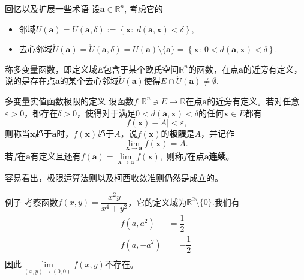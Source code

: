 
\begin{frame}

\begin{block}{回忆以及扩展一些术语}
设$\mathbf{a}\in\mathbb{R}^n$, 考虑它的
\begin{itemize}
\item 邻域$U(\mathbf{a}) = U(\mathbf{a},\delta) := \left\{ \mathbf{x}: \ d(\mathbf{a}, \mathbf{x}) < \delta \right\},$
\item 去心邻域$\mathring{U}(\mathbf{a}) = \mathring{U}(\mathbf{a},\delta) = U(\mathbf{a})\setminus \{\mathbf{a}\} = \left\{ \mathbf{x}: \ 0 < d(\mathbf{a}, \mathbf{x}) < \delta \right\}.$
\end{itemize}

\vspace{2em}
\pause

称多变量函数，即定义域$E$包含于某个欧氏空间$\mathbb{R}^n$的函数，在点$\mathbf{a}$的近旁有定义，说的是存在点$\mathbf{a}$的某个去心邻域$\mathring{U}(\mathbf{a})$使得$E\cap \mathring{U}(\mathbf{a}) \neq \emptyset.$
\end{block}

\end{frame}


\begin{frame}

\begin{block}{多变量实值函数极限的定义}
设函数$f: \mathbb{R}^n \ni E \to \mathbb{R}$在点$\mathbf{a}$的近旁有定义。若对任意$\varepsilon > 0$，都存在$\delta > 0$，使得对于满足$0 < d(\mathbf{a}, \mathbf{x}) < \delta$的任何$\mathbf{x}\in E$都有
\[|f(\mathbf{x})-A| < \varepsilon,\]
则称当$\mathbf{x}$趋于$\mathbf{a}$时，$f(\mathbf{x})$趋于$A$，说$f(\mathbf{x})$的{\bfseries 极限}是$A$，并记作
\[\lim\limits_{\mathbf{x}\to \mathbf{a}}f(\mathbf{x}) = A.\]
若$f$在$\mathbf{a}$有定义且还有$f(\mathbf{a}) = \lim\limits_{\mathbf{x}\to \mathbf{a}}f(\mathbf{x}),$ 则称$f$在点$\mathbf{a}${\bfseries 连续}。
\end{block}

\pause

容易看出，极限运算法则以及柯西收敛准则仍然是成立的。

\end{frame}


\begin{frame}

\begin{block}{例子}
考察函数\(\displaystyle f(x,y) = \dfrac{x^2y}{x^4+y^2}\)，它的定义域为$\mathbb{R}^2\setminus\{0\}.$我们有
\begin{align*}
f(a,a^2) & = \dfrac{1}{2} \\
f(a,-a^2) & = -\dfrac{1}{2} \\
\end{align*}
因此$\lim\limits_{(x,y)\to(0,0)} f(x,y)$不存在。
\end{block}


\end{frame}

